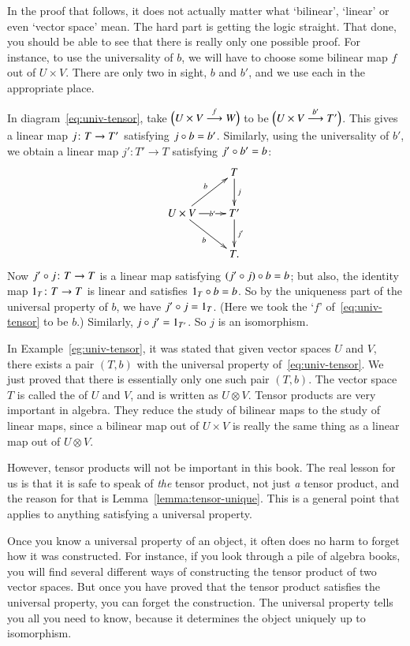 In the proof that follows, it does not actually matter what `bilinear',
`linear' or even `vector space' mean.  The hard part is getting the logic
straight.  That done, you should be able to see that there is really only
one possible proof.  For instance, to use the universality of $b$, we will
have to choose some bilinear map $f$ out of $U\times V$.  There are only
two in sight, $b$ and $b'$, and we use each in the appropriate place.

\begin{pf}
In diagram~\eqref{eq:univ-tensor}, take $\Bigl(U \times V \stackrel{f}{\longrightarrow} W\Bigr)$
to be $\Bigl(U \times V \stackrel{b'}{\longrightarrow} T'\Bigr)$.  This gives a linear map
$j\from T \to T'$ satisfying $j \mathbin{\circ} b = b'$.  Similarly, using the
universality of $b'$, we obtain a linear map $j': T' \to T$ satisfying $j'
\mathbin{\circ} b' = b$:
\[
\xymatrix{
        &T \ar[d]^-j     \\
U \times V \ar[ur]^-b \ar[r]|-{b'} \ar[dr]_b      &
T' \ar[d]^{j'}  \\
&
T.
}
\]
Now $j' \of j\from T \to T$ is a linear map satisfying $(j' \mathbin{\circ} j) \mathbin{\circ} b =
b$; but also, the identity map $1_T\from T \to T$ is linear and satisfies
$1_T \mathbin{\circ} b = b$.  So by the uniqueness part of the universal property of
$b$, we have $j' \mathbin{\circ} j = 1_T$.  (Here we took the `$f$'
of~\eqref{eq:univ-tensor} to be $b$.)  Similarly, $j \mathbin{\circ} j' = 1_{T'}$.  So
$j$ is an isomorphism.  
\end{pf}

In Example~\ref{eg:univ-tensor}, it was stated that given vector spaces $U$
and $V$, there exists a pair $(T, b)$ with the universal property
of~\eqref{eq:univ-tensor}.  We just proved that there is essentially only
one such pair $(T, b)$.  The vector space $T$ is called the  of $U$ and $V$, and is written as $U \otimes V$.%
%
%
Tensor products are very important in algebra.  They reduce the study of
bilinear maps to the study of linear maps, since a bilinear map out of $U
\times V$ is really the same thing as a linear map out of $U \otimes V$.

However, tensor products will not be important in this book.  The real
lesson for us is that it is safe to speak of \emph{the} tensor product, not
just \emph{a} tensor product, and the reason for that is
Lemma~\ref{lemma:tensor-unique}.  This is a general point that applies to
anything satisfying a universal property.

Once you know a universal property of an object, it often does no harm to
forget how it was constructed. For instance, if you look through a pile of
algebra books, you will find several different ways of constructing the
tensor product of two vector spaces.  But once you have proved that the
tensor product satisfies the universal property, you can forget the
construction.%
%
%
The universal property tells you all you need to know, because it
determines the object uniquely up to isomorphism.

